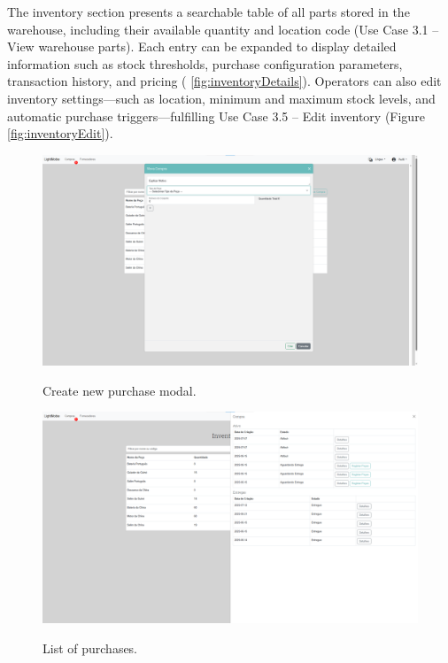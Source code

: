 The inventory section presents a searchable table of all parts stored in the warehouse, including their available quantity and location code (Use Case 3.1 – View warehouse parts). Each entry can be expanded to display detailed information such as stock thresholds, purchase configuration parameters, transaction history, and pricing ( \ref{fig:inventoryDetails}). Operators can also edit inventory settings—such as location, minimum and maximum stock levels, and automatic purchase triggers—fulfilling Use Case 3.5 – Edit inventory (Figure \ref{fig:inventoryEdit}).


\begin{figure}[h]
  \caption{Create new purchase modal.}
  \centering
  \includegraphics[width=\textwidth]{figs/Implementation/warehouse/createPurchase}
  \label{fig:createPurchase}
\end{figure}


\begin{figure}[h]
  \caption{List of purchases.}
  \centering
  \includegraphics[width=\textwidth]{figs/Implementation/warehouse/PurchaseList}
  \label{fig:PurchaseList}
\end{figure}


